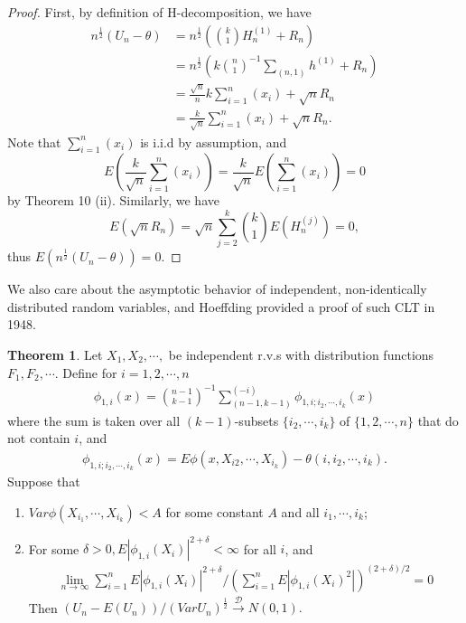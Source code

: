 \documentclass{article}
\theoremstyle{definition}
\newtheorem{theorem}{Theorem}
\numberwithin{Def}{section}
\begin{document}
    \begin{proof}
      First, by definition of H-decomposition, we have 
      \begin{align*}
          n^{\frac{1}{2}}(U_n - \theta) &= n^{\frac{1}{2}} \left( {k \choose 1} H_n^{(1)} + R_n \right) \\
          &= n^{\frac{1}{2}} \left( k {n \choose 1}^{-1} \sum_{ (n,1) } h^{(1)} + R_n \right) \\
          &= \frac{\sqrt{n}}{n} k \sum_{i = 1}^{n} (x_i) + \sqrt{n}R_n \\
          &= \frac{k}{\sqrt{n}} \sum_{i = 1}^{n} (x_i) + \sqrt{n}R_n. 
      \end{align*}
      Note that $\sum_{i = 1}^{n} (x_i)$ is i.i.d by assumption, and $$ E (\frac{k}{\sqrt{n}} \sum_{i = 1}^{n} (x_i)) = \frac{k}{\sqrt{n}} E( \sum_{i = 1}^{n} (x_i) )  = 0$$
      by Theorem 10 (ii). Similarly, we have $$E(\sqrt{n}R_n) = \sqrt{n} \sum_{j = 2}^k {k \choose 1} E(H_n^{(j)}) = 0,$$
      thus $E\left( n^{\frac{1}{2}}(U_n - \theta) \right) = 0. $ 
    \end{proof}
    
    
    We also care about the asymptotic behavior of independent, non-identically distributed random variables, and Hoeffding provided a proof of such CLT in 1948. 
    \begin{theorem}
    Let $X_1, X_2, \cdots,$ be independent r.v.s with distribution functions $F_1, F_2, \cdots$. Define for $i = 1,2, \cdots, n$
    \begin{align}
        \phi_{1,i} (x) = {n-1 \choose k-1}^{-1} \sum_{(n-1, k-1)}^{(-i)} \phi_{1, i; i_2, \cdots, i_k}(x)
    \end{align}
    where the sum is taken over all $(k-1)$-subsets $\{i_2, \cdots, i_k\}$ of $\{1,2, \cdots, n\}$ that do not contain $i$, and 
    \begin{align}
        \phi_{1, i; i_2, \cdots, i_k}(x) = E \phi(x, X_{i2}, \cdots, X_{i_k}) - \theta(i, i_2, \cdots, i_k).
    \end{align}
    Suppose that 
    \begin{enumerate}[label = (\roman*)]
        \item $Var \phi(X_{i_1}, \cdots, X_{i_k} ) < A$ for some constant $A$ and all $i_1, \cdots, i_k$;
        \item For some $\delta > 0, E|\phi_{1, i} (X_i) |^{2 + \delta} < \infty$ for all $i$, and 
        \begin{align}
            \lim_{n \rightarrow \infty} \sum_{i =1}^{n} E|\phi_{1, i} (X_i) |^{2 + \delta} \Big/ (\sum_{i =1}^{n} E|\phi_{1, i} (X_i)^2 |) ^{(2 + \delta)/2} = 0
        \end{align}
       Then $(U_n - E(U_n)) / (Var U_n)^{\frac{1}{2}} \xrightarrow{\mathcal{D}} N(0,1).$ 
    \end{enumerate}
    \end{theorem}
\end{document}
